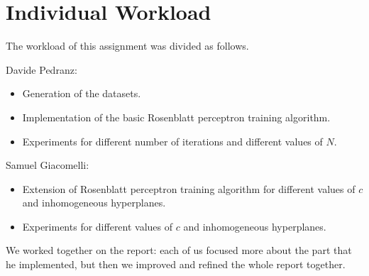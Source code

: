 \section{Individual Workload}
The workload of this assignment was divided as follows.

Davide Pedranz:
\begin{itemize}
    \item Generation of the datasets.
    \item Implementation of the basic Rosenblatt perceptron training algorithm.
    \item Experiments for different number of iterations and different values of $N$.
\end{itemize}

Samuel Giacomelli:
\begin{itemize}
    \item Extension of Rosenblatt perceptron training algorithm for different values of $c$ and inhomogeneous hyperplanes.
    \item Experiments for different values of $c$ and inhomogeneous hyperplanes.
\end{itemize}

We worked together on the report:
each of us focused more about the part that he implemented, but then we improved and refined the whole report together.
